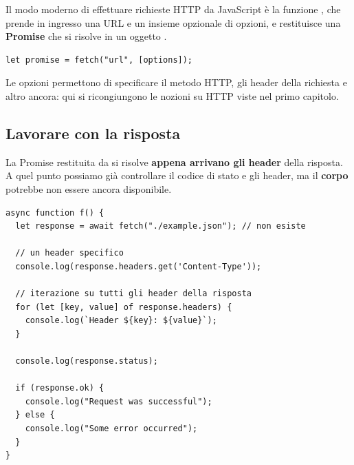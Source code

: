 Il modo moderno di effettuare richieste HTTP da JavaScript è la funzione
, che prende in ingresso una URL e un insieme opzionale di
opzioni, e restituisce una \textbf{Promise} che si risolve in un oggetto
.

\begin{lstlisting}[style=js]
let promise = fetch("url", [options]);
\end{lstlisting}

Le opzioni permettono di specificare il metodo HTTP, gli header della richiesta
e altro ancora: qui si ricongiungono le nozioni su HTTP viste nel primo
capitolo.

\subsection{Lavorare con la risposta}

La Promise restituita da  si risolve \textbf{appena arrivano gli
header} della risposta. A quel punto possiamo già controllare il codice di stato
e gli header, ma il \textbf{corpo} potrebbe non essere ancora disponibile.

\begin{affianco}[0.55][c]
\begin{lstlisting}[style=js, name=fetch-response.js]
async function f() {
  let response = await fetch("./example.json"); // non esiste

  // un header specifico
  console.log(response.headers.get('Content-Type'));

  // iterazione su tutti gli header della risposta
  for (let [key, value] of response.headers) {
    console.log(`Header ${key}: ${value}`);
  }

  console.log(response.status);

  if (response.ok) {
    console.log("Request was successful");
  } else {
    console.log("Some error occurred");
  }
}
\end{lstlisting}
\risultato
\begin{immagine}
\end{immagine}
\end{affianco}


